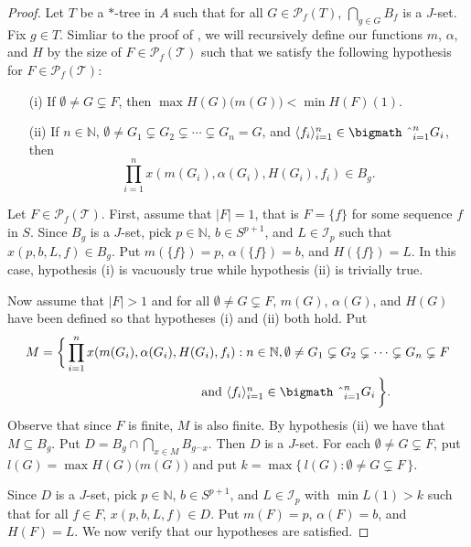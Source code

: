 \documentclass{article}
\theoremstyle{plain}
\theoremstyle{definition}
\newcommand{\la}{\langle}
\newcommand{\ra}{\rangle}
\newcommand{\bbN}{\mathbb{N}}
\newcommand{\calI}{\mathcal{I}}
\newcommand{\calT}{\mathcal{T}}
\newcommand{\Pf}{\mathcal{P}_f}
\newcommand{\bigtimes}{\hbox{\bigmath \char'2}}
\begin{document}
\begin{proof}
  Let $T$ be a \mbox{$*$-tree} in $A$ such that for all $G \in
  \Pf(T)$, $\bigcap_{g \in G} B_f$ is a $J$-set.
  Fix $g \in T$.
  Simliar to the proof of \cite[Theorem 3.8]{De:2008uq}, we will
  recursively define our functions $m$, $\alpha$, and $H$ by the size
  of $F \in \Pf(\calT)$ such that we satisfy the following hypothesis
  for $F \in \Pf(\calT)$:
  \begin{itemize}
    \item[(i)] If $\emptyset \ne G \subsetneq F$, then $\max
      H(G)\bigl(m(G)\bigr) < \min H(F)(1)$.

    \item[(ii)] If $n \in \bbN$, $\emptyset \ne G_1 \subsetneq G_2
      \subsetneq \cdots \subsetneq G_n = G$, and $\la f_i \ra_{i=1}^n
      \in \bigtimes_{i=1}^n G_i$, then 
      \[
        \prod_{i=1}^n x(m(G_i), \alpha(G_i), H(G_i), f_i) \in B_g.
      \]
  \end{itemize}

  Let $F \in \Pf(\calT)$.
  First, assume that $|F| = 1$, that is $F = \{f\}$ for some sequence
  $f$ in $S$. 
  Since $B_g$ is a $J$-set, pick $p \in \bbN$, $b \in S^{p+1}$, and $L
  \in \calI_p$ such that $x(p, b, L, f) \in B_g$.
  Put $m(\{f\}) = p$, $\alpha(\{f\}) = b$, and $H(\{f\}) = L$. 
  In this case, hypothesis (i) is vacuously true while hypothesis (ii)
  is trivially true.

  Now assume that $|F| > 1$ and for all $\emptyset \ne G \subsetneq
  F$, $m(G)$, $\alpha(G)$, and $H(G)$ have been defined so that
  hypotheses (i) and (ii) both hold.
  Put
  \begin{align*}
    M = \biggl\{\, \prod_{i=1}^n x(m(G_i), \alpha(G_i), H(G_i), f_i) &: n \in
    \bbN, \emptyset \ne G_1 \subsetneq G_2 \subsetneq \cdots
    \subsetneq G_n \subsetneq F \\
    &\hspace{-3em}\mbox{ and $\la f_i \ra_{i=1}^n \in \bigtimes_{i=1}^n G_i$} \,\biggr\}.
  \end{align*}
  Observe that since $F$ is finite, $M$ is also finite. 
  By hypothesis (ii) we have that $M \subseteq B_g$.
  Put $D = B_g \cap \bigcap_{x \in M} B_{g^\frown x}$.
  Then $D$ is a $J$-set. 
  For each $\emptyset \ne G \subsetneq F$, put $l(G) = \max
  H(G)\bigl(m(G)\bigr)$ and put $k = \max\{\, l(G) : \emptyset \ne G
  \subsetneq F\,\}$.

  Since $D$ is a $J$-set, pick $p \in \bbN$, $b \in S^{p+1}$, and $L
  \in \calI_p$ with $\min L(1) > k$ such that for all $f \in F$, $x(p,
  b, L, f) \in D$. 
  Put $m(F) = p$, $\alpha(F) = b$, and $H(F) = L$. 
  We now verify that our hypotheses are satisfied. 


\end{proof}
\end{document}
